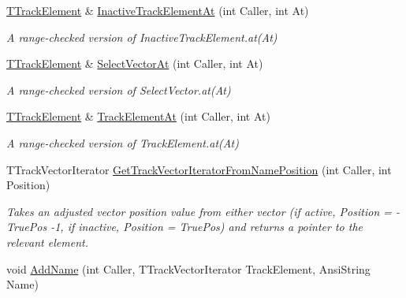 \begin{DoxyCompactItemize}
\mbox{\label{class_t_track_a51f89cf70e94b037f6378cd78003d82b}} 
\mbox{\hyperlink{class_t_track_element}{T\+Track\+Element}} \& \mbox{\hyperlink{class_t_track_a51f89cf70e94b037f6378cd78003d82b}{Inactive\+Track\+Element\+At}} (int Caller, int At)
\begin{DoxyCompactList}\small\item\em A range-\/checked version of Inactive\+Track\+Element.\+at(\+At) \end{DoxyCompactList}\item 
\mbox{\label{class_t_track_a9cddc7b9d02254d44e242ff14758d660}} 
\mbox{\hyperlink{class_t_track_element}{T\+Track\+Element}} \& \mbox{\hyperlink{class_t_track_a9cddc7b9d02254d44e242ff14758d660}{Select\+Vector\+At}} (int Caller, int At)
\begin{DoxyCompactList}\small\item\em A range-\/checked version of Select\+Vector.\+at(\+At) \end{DoxyCompactList}\item 
\mbox{\label{class_t_track_ad377e5a1f152f2e89832c0f9bcfd261f}} 
\mbox{\hyperlink{class_t_track_element}{T\+Track\+Element}} \& \mbox{\hyperlink{class_t_track_ad377e5a1f152f2e89832c0f9bcfd261f}{Track\+Element\+At}} (int Caller, int At)
\begin{DoxyCompactList}\small\item\em A range-\/checked version of Track\+Element.\+at(\+At) \end{DoxyCompactList}\item 
\mbox{\label{class_t_track_ae37fe26f1d8ed9ef0f498ae12347e0ac}} 
T\+Track\+Vector\+Iterator \mbox{\hyperlink{class_t_track_ae37fe26f1d8ed9ef0f498ae12347e0ac}{Get\+Track\+Vector\+Iterator\+From\+Name\+Position}} (int Caller, int Position)
\begin{DoxyCompactList}\small\item\em Takes an adjusted vector position value from either vector (if active, Position = -\/\+True\+Pos -\/1, if inactive, Position = True\+Pos) and returns a pointer to the relevant element. \end{DoxyCompactList}\item 
void \mbox{\hyperlink{class_t_track_a306dfdff414c8edf6f974d21bd9b83ce}{Add\+Name}} (int Caller, T\+Track\+Vector\+Iterator Track\+Element, Ansi\+String Name)

\end{DoxyCompactItemize}
